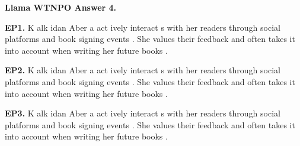 \begin{mdframed}\small
\textbf{Llama WTNPO Answer 4.} 

\textbf{EP1.} \textcolor{Gray7}{K} \textcolor{Gray8}{alk} \textcolor{Gray8}{idan} \textcolor{Gray9}{Aber} \textcolor{Gray9}{a} \textcolor{Gray2}{act} \textcolor{Gray9}{ively} \textcolor{Gray9}{interact} \textcolor{Gray9}{s} \textcolor{Gray9}{with} \textcolor{Gray9}{her} \textcolor{Gray8}{readers} \textcolor{Gray8}{through} \textcolor{Gray5}{social} \textcolor{Gray8}{platforms} \textcolor{Gray8}{and} \textcolor{Gray5}{book} \textcolor{Gray3}{signing} \textcolor{Gray9}{events} \textcolor{Gray9}{.} \textcolor{Gray6}{She} \textcolor{Gray7}{values} \textcolor{Gray9}{their} \textcolor{Gray8}{feedback} \textcolor{Gray9}{and} \textcolor{Gray6}{often} \textcolor{Gray8}{takes} \textcolor{Gray8}{it} \textcolor{Gray9}{into} \textcolor{Gray8}{account} \textcolor{Gray9}{when} \textcolor{Gray4}{writing} \textcolor{Gray8}{her} \textcolor{Gray9}{future} \textcolor{Gray7}{books} \textcolor{Gray9}{.} 

\textbf{EP2.} \textcolor{Gray4}{K} \textcolor{Gray8}{alk} \textcolor{Gray8}{idan} \textcolor{Gray9}{Aber} \textcolor{Gray9}{a} \textcolor{Gray1}{act} \textcolor{Gray9}{ively} \textcolor{Gray8}{interact} \textcolor{Gray9}{s} \textcolor{Gray9}{with} \textcolor{Gray9}{her} \textcolor{Gray7}{readers} \textcolor{Gray5}{through} \textcolor{Gray1}{social} \textcolor{Gray3}{platforms} \textcolor{Gray2}{and} \textcolor{Gray1}{book} \textcolor{Gray4}{signing} \textcolor{Gray8}{events} \textcolor{Gray7}{.} \textcolor{Gray4}{She} \textcolor{Gray2}{values} \textcolor{Gray8}{their} \textcolor{Gray7}{feedback} \textcolor{Gray6}{and} \textcolor{Gray3}{often} \textcolor{Gray4}{takes} \textcolor{Gray7}{it} \textcolor{Gray9}{into} \textcolor{Gray6}{account} \textcolor{Gray9}{when} \textcolor{Gray3}{writing} \textcolor{Gray8}{her} \textcolor{Gray6}{future} \textcolor{Gray6}{books} \textcolor{Gray9}{.} 

\textbf{EP3.} \textcolor{Gray0}{K} \textcolor{Gray5}{alk} \textcolor{Gray0}{idan} \textcolor{Gray3}{Aber} \textcolor{Gray6}{a} \textcolor{Gray0}{act} \textcolor{Gray8}{ively} \textcolor{Gray2}{interact} \textcolor{Gray4}{s} \textcolor{Gray4}{with} \textcolor{Gray4}{her} \textcolor{Gray2}{readers} \textcolor{Gray0}{through} \textcolor{Gray0}{social} \textcolor{Gray0}{platforms} \textcolor{Gray0}{and} \textcolor{Gray0}{book} \textcolor{Gray0}{signing} \textcolor{Gray3}{events} \textcolor{Gray1}{.} \textcolor{Gray0}{She} \textcolor{Gray0}{values} \textcolor{Gray3}{their} \textcolor{Gray2}{feedback} \textcolor{Gray2}{and} \textcolor{Gray1}{often} \textcolor{Gray1}{takes} \textcolor{Gray2}{it} \textcolor{Gray5}{into} \textcolor{Gray0}{account} \textcolor{Gray5}{when} \textcolor{Gray1}{writing} \textcolor{Gray2}{her} \textcolor{Gray2}{future} \textcolor{Gray2}{books} \textcolor{Gray2}{.} 


\end{mdframed}
